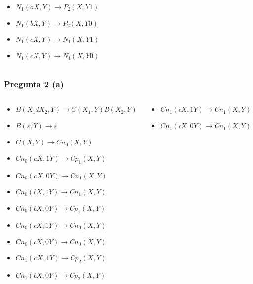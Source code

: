\documentclass{beamer}
\begin{document}
\begin{frame}
\begin{columns}
\begin{column}{0.48\textwidth}
\begin{itemize}
                \item $N_1(aX,Y)\to P_2(X,Y1)$
                \item $N_1(bX,Y)\to P_2(X,Y0)$
                \item $N_1(cX,Y)\to N_1(X,Y1)$
                \item $N_1(cX,Y)\to N_1(X,Y0)$
            \end{itemize}
        \end{column}
        
    \end{columns}
\end{frame}

\begin{frame}
    \frametitle{Pregunta 2 (a)}
    
    \begin{columns}
        \begin{column}{0.5\textwidth}
            \begin{itemize}
                \item $B(X_1dX_2,Y)\to C(X_1,Y) B(X_2,Y)$
                \item $B(\varepsilon,Y)\to\varepsilon$
                      
                \item $C(X,Y)\to Cn_0(X,Y)$
                      
                \item $Cn_0(aX,1Y) \to Cp_1(X,Y)$
                \item $Cn_0(aX,0Y) \to Cn_1(X,Y)$
                \item $Cn_0(bX,1Y) \to Cn_1(X,Y)$
                \item $Cn_0(bX,0Y) \to Cp_1(X,Y)$
                \item $Cn_0(cX,1Y) \to Cn_0(X,Y)$
                \item $Cn_0(cX,0Y) \to Cn_0(X,Y)$
                      
                \item $Cn_1(aX,1Y) \to Cp_2(X,Y)$
                \item $Cn_1(bX,0Y) \to Cp_2(X,Y)$
            \end{itemize}
        \end{column}
        \begin{column}{0.5\textwidth}
            \begin{itemize}
                \item $Cn_1(cX,1Y) \to Cn_1(X,Y)$
                \item $Cn_1(cX,0Y) \to Cn_1(X,Y)$
                      

\end{itemize}
\end{column}
\end{columns}
\end{frame}
\end{document}
